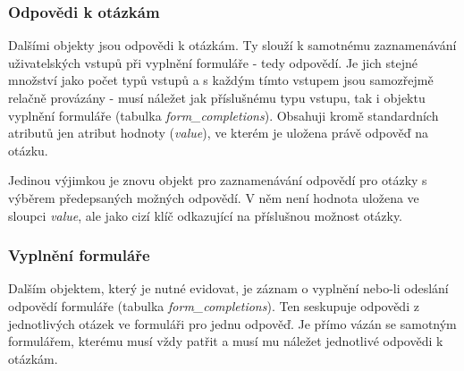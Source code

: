 	\subsubsection{Odpovědi k otázkám}
	Dalšími objekty jsou odpovědi k otázkám. Ty slouží k samotnému zaznamenávání uživatelských vstupů při vyplnění formuláře - tedy odpovědí. Je jich stejné množství jako počet typů vstupů a s každým tímto vstupem jsou samozřejmě relačně provázány - musí náležet jak příslušnému typu vstupu, tak i objektu vyplnění formuláře (tabulka \textit{form\_completions}). Obsahuji kromě standardních atributů jen atribut hodnoty (\textit{value}), ve kterém je uložena právě odpověď na otázku.
	
	Jedinou výjimkou je znovu objekt pro zaznamenávání odpovědí pro otázky s výběrem předepsaných možných odpovědí. V něm není hodnota uložena ve sloupci \textit{value}, ale jako cizí klíč odkazující na příslušnou možnost otázky.
	
	\subsubsection{Vyplnění formuláře}\label{sec:form_completions}
	Dalším objektem, který je nutné evidovat, je záznam o vyplnění nebo-li odeslání odpovědí formuláře (tabulka \textit{form\_completions}). Ten seskupuje odpovědi z jednotlivých otázek ve formuláři pro jednu odpověď. Je přímo vázán se samotným formulářem, kterému musí vždy patřit a musí mu náležet jednotlivé odpovědi k otázkám.
	
	
	